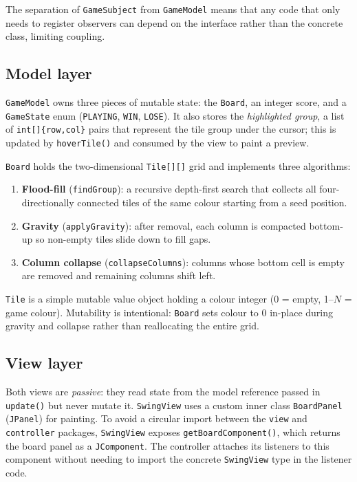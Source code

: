 \documentclass[12pt,a4paper]{article}
\begin{document}
The separation of \texttt{GameSubject} from \texttt{GameModel} means that
any code that only needs to register observers can depend on the interface
rather than the concrete class, limiting coupling.

\subsection{Model layer}

\texttt{GameModel} owns three pieces of mutable state: the \texttt{Board},
an integer score, and a \texttt{GameState} enum (\texttt{PLAYING},
\texttt{WIN}, \texttt{LOSE}).
It also stores the \emph{highlighted group}, a list of \texttt{int[]\{row,col\}}
pairs that represent the tile group under the cursor; this is updated by
\texttt{hoverTile()} and consumed by the view to paint a preview.

\texttt{Board} holds the two-dimensional \texttt{Tile[][]} grid and implements
three algorithms:

\begin{enumerate}
  \item \textbf{Flood-fill} (\texttt{findGroup}): a recursive depth-first search
        that collects all four-directionally connected tiles of the same colour
        starting from a seed position.
  \item \textbf{Gravity} (\texttt{applyGravity}): after removal, each column is
        compacted bottom-up so non-empty tiles slide down to fill gaps.
  \item \textbf{Column collapse} (\texttt{collapseColumns}): columns whose
        bottom cell is empty are removed and remaining columns shift left.
\end{enumerate}

\texttt{Tile} is a simple mutable value object holding a colour integer
(0 = empty, 1–\(N\) = game colour).
Mutability is intentional: \texttt{Board} sets colour to 0 in-place during
gravity and collapse rather than reallocating the entire grid.

\subsection{View layer}

Both views are \emph{passive}: they read state from the model reference passed
in \texttt{update()} but never mutate it.
\texttt{SwingView} uses a custom inner class \texttt{BoardPanel} (\texttt{JPanel})
for painting.
To avoid a circular import between the \texttt{view} and \texttt{controller}
packages, \texttt{SwingView} exposes \texttt{getBoardComponent()}, which returns
the board panel as a \texttt{JComponent}.
The controller attaches its listeners to this component without needing to
import the concrete \texttt{SwingView} type in the listener code.
\end{document}
